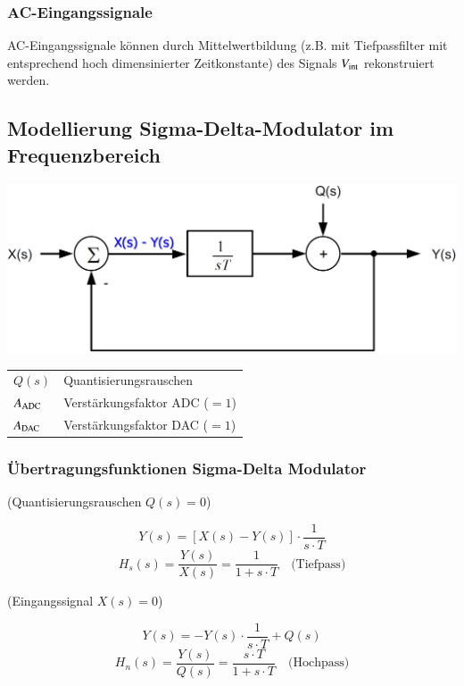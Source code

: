 \subsubsection{AC-Eingangssignale}

AC-Eingangssignale können durch Mittelwertbildung (z.B. mit Tiefpassfilter mit entsprechend hoch dimensinierter Zeitkonstante) 
des Signals $V_{\rm int}$ rekonstruiert werden.




\subsection{Modellierung Sigma-Delta-Modulator im Frequenzbereich}

\begin{minipage}[c]{0.4\columnwidth}
    \includegraphics[width=\columnwidth]{images/sigma-delta-modulator_frequenzbereich.png}
\end{minipage}
\hfill
\begin{minipage}[c]{0.58\columnwidth}

    \begin{tabular}{ll}
        $Q(s)$          & Quantisierungsrauschen \\
        $A_{\rm ADC}$   & Verstärkungsfaktor ADC ($=1$) \\
        $A_{\rm DAC}$   & Verstärkungsfaktor DAC ($=1$) 
    \end{tabular}
\end{minipage}


\subsubsection{Übertragungsfunktionen Sigma-Delta Modulator}

\begin{minipage}[t]{0.48\columnwidth}
    \begin{center}
        (Quantisierungsrauschen $Q(s) = 0$)
    \end{center}
    $$ Y(s) = [X(s) - Y(s)] \cdot\frac{1}{s \cdot T} $$
    $$ \boxed{ H_s(s) = \frac{Y(s)}{X(s)} = \frac{1}{1 + s \cdot T} \quad \text{(Tiefpass)}} $$
\end{minipage}
\hfill
\begin{minipage}[t]{0.48\columnwidth}
    \begin{center}
        (Eingangssignal $X(s) = 0$)
    \end{center}
    $$ Y(s) = - Y(s) \cdot\frac{1}{s \cdot T} + Q(s) $$
    $$ \boxed{ H_n(s) = \frac{Y(s)}{Q(s)} = \frac{s \cdot T}{1 + s \cdot T} \quad \text{(Hochpass)}} $$
\end{minipage}

